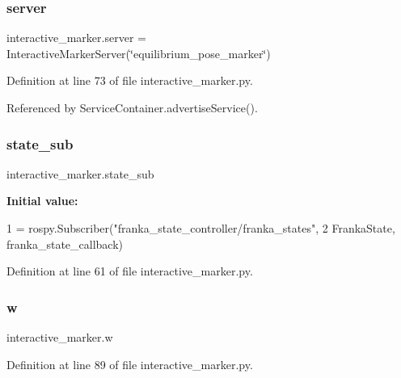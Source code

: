 \subsubsection{\texorpdfstring{server}{server}}
{\footnotesize\ttfamily interactive\+\_\+marker.\+server = Interactive\+Marker\+Server(\char`\"{}equilibrium\+\_\+pose\+\_\+marker\char`\"{})}



Definition at line 73 of file interactive\+\_\+marker.\+py.



Referenced by Service\+Container.\+advertise\+Service().

\mbox{\label{namespaceinteractive__marker_a260de5ba27646b7e6840abc1819deea8}} 
\subsubsection{\texorpdfstring{state\+\_\+sub}{state\_sub}}
{\footnotesize\ttfamily interactive\+\_\+marker.\+state\+\_\+sub}

{\bfseries Initial value\+:}
\begin{DoxyCode}
1 =  rospy.Subscriber(\textcolor{stringliteral}{"franka\_state\_controller/franka\_states"},
2                                  FrankaState, franka\_state\_callback)
\end{DoxyCode}


Definition at line 61 of file interactive\+\_\+marker.\+py.

\mbox{\label{namespaceinteractive__marker_a762d2be287d5bc9ccc79401f4c401bd3}} 
\subsubsection{\texorpdfstring{w}{w}}
{\footnotesize\ttfamily interactive\+\_\+marker.\+w}



Definition at line 89 of file interactive\+\_\+marker.\+py.

\mbox{\label{namespaceinteractive__marker_acda52804aef30b460a72fb21ee01d69d}} 
